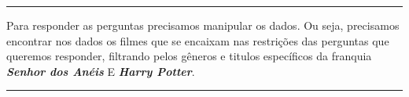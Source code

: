 \documentclass[]{article}
\newenvironment{Shaded}{\begin{snugshade}}{\end{snugshade}}
\newcommand{\CommentTok}[1]{\textcolor[rgb]{0.56,0.35,0.01}{\textit{#1}}}
\newcommand{\KeywordTok}[1]{\textcolor[rgb]{0.13,0.29,0.53}{\textbf{#1}}}
\newcommand{\NormalTok}[1]{#1}
\newcommand{\OperatorTok}[1]{\textcolor[rgb]{0.81,0.36,0.00}{\textbf{#1}}}
\newcommand{\StringTok}[1]{\textcolor[rgb]{0.31,0.60,0.02}{#1}}
\begin{document}
\begin{center}\rule{0.5\linewidth}{\linethickness}\end{center}

Para responder as perguntas precisamos manipular os dados. Ou seja,
precisamos encontrar nos dados os filmes que se encaixam nas restrições
das perguntas que queremos responder, filtrando pelos gêneros e titulos
específicos da franquia \textbf{\emph{Senhor dos Anéis}} E
\textbf{\emph{Harry Potter}}.

\begin{center}\rule{0.5\linewidth}{\linethickness}\end{center}

\begin{Shaded}
\end{Shaded}
\end{document}
